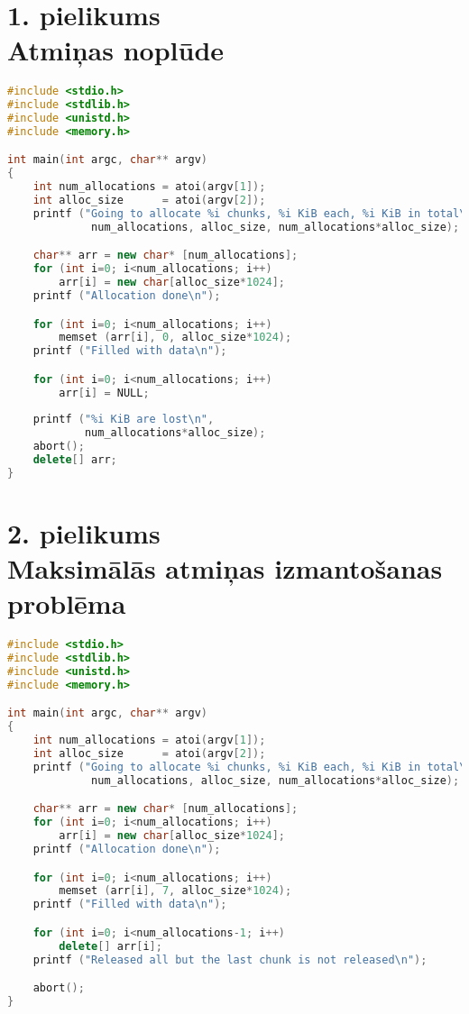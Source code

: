 ﻿

\chapter[1. pielikums. Atmiņas noplūde] {1. pielikums \\  Atmiņas noplūde}

    
   
\begin{lstlisting}[language=C++]
#include <stdio.h>
#include <stdlib.h>
#include <unistd.h>
#include <memory.h>

int main(int argc, char** argv)
{
	int num_allocations = atoi(argv[1]);
	int alloc_size      = atoi(argv[2]);
	printf ("Going to allocate %i chunks, %i KiB each, %i KiB in total\n",
	         num_allocations, alloc_size, num_allocations*alloc_size);

	char** arr = new char* [num_allocations];
	for (int i=0; i<num_allocations; i++)
		arr[i] = new char[alloc_size*1024];
	printf ("Allocation done\n");

	for (int i=0; i<num_allocations; i++)
		memset (arr[i], 0, alloc_size*1024);
	printf ("Filled with data\n");

	for (int i=0; i<num_allocations; i++)
		arr[i] = NULL;
        
	printf ("%i KiB are lost\n", 
			num_allocations*alloc_size);
	abort();
	delete[] arr;
} 
\end{lstlisting}

\newpage
\chapter[2. pielikums. Maksimālās atmiņas izmantošanas problēma] {2. pielikums \\  Maksimālās atmiņas izmantošanas problēma}



\begin{lstlisting}[language=C++]
#include <stdio.h>
#include <stdlib.h>
#include <unistd.h>
#include <memory.h>

int main(int argc, char** argv)
{
	int num_allocations = atoi(argv[1]);
	int alloc_size      = atoi(argv[2]);
	printf ("Going to allocate %i chunks, %i KiB each, %i KiB in total\n",
	         num_allocations, alloc_size, num_allocations*alloc_size);

	char** arr = new char* [num_allocations];
	for (int i=0; i<num_allocations; i++)
		arr[i] = new char[alloc_size*1024];
	printf ("Allocation done\n");

	for (int i=0; i<num_allocations; i++)
		memset (arr[i], 7, alloc_size*1024);
	printf ("Filled with data\n");

	for (int i=0; i<num_allocations-1; i++)
		delete[] arr[i];
	printf ("Released all but the last chunk is not released\n");

	abort();
} 
\end{lstlisting}

